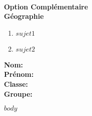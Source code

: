 \documentclass[11pt,a4paper,addpoints,$params.lang$,
$for(classoption)$
  $classoption$$sep$,
$endfor$$if(subclass)$,$subclass$$endif$]{exam}
\begin{document}
~
\vspace{2cm}
\begin{center}
	\bfseries\Huge Option Complémentaire\\ Géographie
	\vspace{3cm}
\end{center}
\vspace{2cm}

\begin{tpBox}
\begin{enumerate}\Large\centering
	\item $sujet1$
	\item $sujet2$
\end{enumerate}
\end{tpBox}
\vspace{3cm}

\renewcommand\ULthickness{1pt}\setlength\ULdepth{.5ex}\Large\bfseries
Nom:\tabto{3cm} \uline{\hfill}\\[.5cm]
Prénom:\tabto{3cm} \uline{\hfill}\\[.5cm]
Classe:\tabto{3cm} \uline{\hfill}\\[.5cm]
Groupe:\tabto{3cm} \uline{\hfill}\\[.5cm]

\renewcommand\ULthickness{.5pt}\setlength\ULdepth{.3ex}\normalfont

\clearpage
{}
\pagestyle{foot}

$body$
\end{document}
